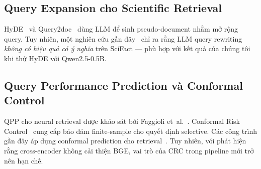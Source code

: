 \subsection{Query Expansion cho Scientific Retrieval}
HyDE~\citep{gao2022hyde} và Query2doc~\citep{wang2023query2doc} dùng LLM để sinh pseudo-document
nhằm mở rộng query. Tuy nhiên, một nghiên cứu gần đây~\citep{anonymous2025notallqueries} chỉ ra
rằng LLM query rewriting \emph{không có hiệu quả có ý nghĩa} trên SciFact --- phù hợp với kết quả
của chúng tôi khi thử HyDE với Qwen2.5-0.5B.

\subsection{Query Performance Prediction và Conformal Control}
QPP cho neural retrieval được khảo sát bởi Faggioli et~al.~\citep{faggioli2023qpp}. Conformal Risk
Control~\citep{angelopoulos2024crc} cung cấp bảo đảm finite-sample cho quyết định selective. Các
công trình gần đây áp dụng conformal prediction cho retrieval~\citep{anonymous2024conformalir}.
Tuy nhiên, với phát hiện rằng cross-encoder không cải thiện BGE, vai trò của CRC trong pipeline
mới trở nên hạn chế.

